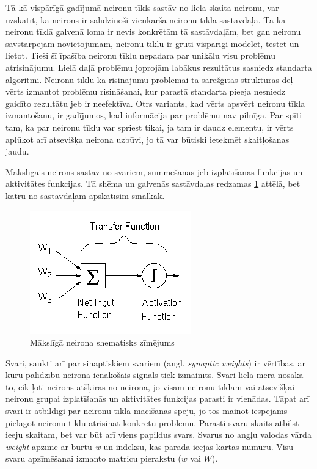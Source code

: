 \documentclass[12pt,paper=a4]{report}
\begin{document}
Tā kā vispārīgā gadījumā neironu tīkls sastāv no liela skaita neironu, var uzskatīt, ka neirons ir salīdzinoši vienkārša neironu tīkla sastāvdaļa. Tā kā neironu tīklā galvenā loma ir nevis konkrētām tā sastāvdaļām, bet gan neironu savstarpējam novietojumam, neironu tīklu ir grūti vispārīgi modelēt, testēt un lietot. Tieši šī īpašība neironu tīklu nepadara par unikālu visu problēmu atrisinājumu. Lielā daļā problēmu joprojām labākus rezultātus sasniedz standarta algoritmi. Neironu tīklu kā risinājumu problēmai tā sarežģītās struktūras dēļ vērts izmantot problēmu risināšanai, kur parastā standarta pieeja nesniedz gaidīto rezultātu jeb ir neefektīva. Otrs variants, kad vērts apsvērt neironu tīkla izmantošanu, ir gadījumos, kad informācija par problēmu nav pilnīga. Par spīti tam, ka par neironu tīklu var spriest tikai, ja tam ir daudz elementu, ir vērts aplūkot arī atsevišķa neirona uzbūvi, jo tā var būtiski ietekmēt skaitļošanas jaudu. \cite{zutersNeironuTikli}\par
Mākslīgais neirons sastāv no svariem, summēšanas jeb izplatīšanas funkcijas un aktivitātes funkcijas. Tā shēma un galvenās sastāvdaļas redzamas \ref{fig:artificialNeuron} attēlā, bet katru no sastāvdaļām apskatīsim smalkāk.
\begin{figure}[h!]
\centering
\includegraphics[scale=0.85]{transfer}
\caption{Mākslīgā neirona shematisks zīmējums \cite{dennis1997introduction}}
\label{fig:artificialNeuron}
\end{figure}\par
Svari, saukti arī par sinaptiskiem svariem (angl. \textit{synaptic weights}) ir vērtības, ar kuru palīdzību neironā ienākošais signāls tiek izmainīts. Svari lielā mērā nosaka to, cik ļoti neirons atšķiras no neirona, jo visam neironu tīklam vai atsevišķai neironu grupai izplatīšanās un aktivitātes funkcijas parasti ir vienādas. Tāpat arī svari ir atbildīgi par neironu tīkla mācīšanās spēju, jo tos mainot iespējams pielāgot neironu tīklu atrisināt konkrētu problēmu. Parasti svaru skaits atbilst ieeju skaitam, bet var būt arī viens papildus svars. Svarus no angļu valodas vārda \textit{weight} apzīmē ar burtu \textit{w} un indeksu, kas parāda ieejas kārtas numuru. Visu svaru apzīmēšanai izmanto matricu pierakstu ($w$ vai $W$).\cite{zutersNeironuTikli}\par
\end{document}
